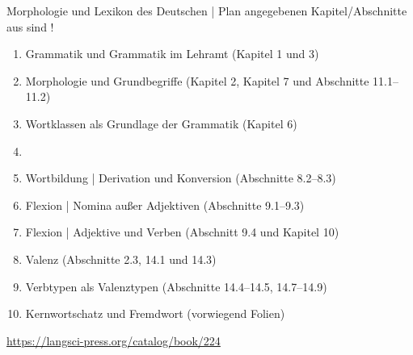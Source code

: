   \begin{frame}
    {Morphologie und Lexikon des Deutschen | Plan}
     angegebenen Kapitel\slash Abschnitte aus  sind !\\
    \Halbzeile
    \begin{enumerate}
      \item Grammatik und Grammatik im Lehramt (Kapitel 1 und 3)
      \item Morphologie und Grundbegriffe (Kapitel 2, Kapitel 7 und Abschnitte 11.1--11.2)
      \item Wortklassen als Grundlage der Grammatik (Kapitel 6)
      \item {}
      \item Wortbildung | Derivation und Konversion (Abschnitte 8.2--8.3)
      \item Flexion | Nomina außer Adjektiven (Abschnitte 9.1--9.3)
      \item Flexion | Adjektive und Verben (Abschnitt 9.4 und Kapitel 10)
      \item Valenz (Abschnitte 2.3, 14.1 und 14.3)
      \item Verbtypen als Valenztypen (Abschnitte 14.4--14.5, 14.7--14.9) 
      \item Kernwortschatz und Fremdwort (vorwiegend Folien)
    \end{enumerate}
    \Halbzeile
    \centering 
    \url{https://langsci-press.org/catalog/book/224}
  \end{frame}
\fi
